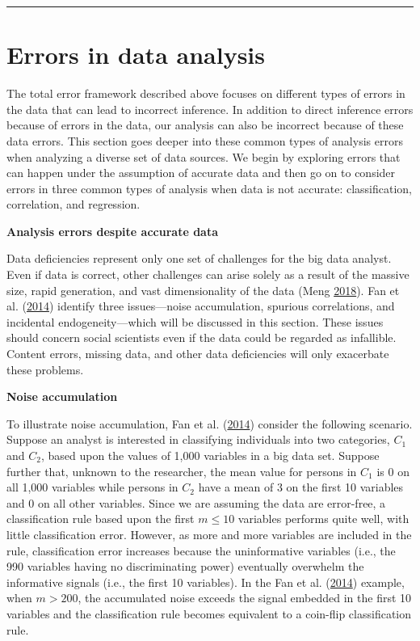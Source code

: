 \documentclass[]{krantz}
\begin{document}
\begin{center}\rule{0.5\linewidth}{\linethickness}\end{center}

\hypertarget{sec:10-4}{\section{Errors in data
analysis}\label{sec:10-4}}

The total error framework described above focuses on different types of
errors in the data that can lead to incorrect inference. In addition to
direct inference errors because of errors in the data, our analysis can
also be incorrect because of these data errors. This section goes deeper
into these common types of analysis errors when analyzing a diverse set
of data sources. We begin by exploring errors that can happen under the
assumption of accurate data and then go on to consider errors in three
common types of analysis when data is not accurate: classification,
correlation, and regression.

\textbf{Analysis errors despite accurate data}

Data deficiencies represent only one set of challenges for the big data
analyst. Even if data is correct, other challenges can arise solely as a
result of the massive size, rapid generation, and vast dimensionality of
the data (Meng \protect\hyperlink{ref-meng2018}{2018}). Fan et al.
(\protect\hyperlink{ref-fan2014challenges}{2014}) identify three
issues---noise accumulation, spurious correlations, and incidental
endogeneity---which will be discussed in this section. These issues
should concern social scientists even if the data could be regarded as
infallible. Content errors, missing data, and other data deficiencies
will only exacerbate these problems.

\textbf{Noise accumulation}

To illustrate noise accumulation, Fan et al.
(\protect\hyperlink{ref-fan2014challenges}{2014}) consider the following
scenario. Suppose an analyst is interested in classifying individuals
into two categories, \(C_{1}\) and \(C_{2}\), based upon the values of
1,000 variables in a big data set. Suppose further that, unknown to the
researcher, the mean value for persons in \(C_{1}\) is 0 on all 1,000
variables while persons in \(C_{2}\) have a mean of 3 on the first 10
variables and 0 on all other variables. Since we are assuming the data
are error-free, a classification rule based upon the first \(m \le 10\)
variables performs quite well, with little classification error.
However, as more and more variables are included in the rule,
classification error increases because the uninformative variables
(i.e., the 990 variables having no discriminating power) eventually
overwhelm the informative signals (i.e., the first 10 variables). In the
Fan et al. (\protect\hyperlink{ref-fan2014challenges}{2014}) example,
when \(m > 200\), the accumulated noise exceeds the signal embedded in
the first 10 variables and the classification rule becomes equivalent to
a coin-flip classification rule.
\end{document}
